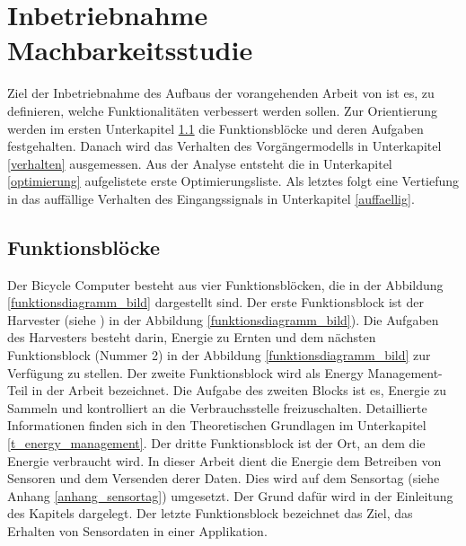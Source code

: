  
\section{Inbetriebnahme Machbarkeitsstudie}\label{v_inbetriebnahme} 

      
Ziel der Inbetriebnahme des Aufbaus der vorangehenden Arbeit von \cite{PA_bicycle} ist es, zu definieren, welche Funktionalitäten verbessert werden sollen. Zur Orientierung werden im ersten Unterkapitel \ref{fb} die Funktionsblöcke und deren Aufgaben festgehalten. Danach wird das Verhalten des Vorgängermodells in Unterkapitel \ref{verhalten} ausgemessen. Aus der Analyse entsteht die in Unterkapitel \ref{optimierung} aufgelistete erste Optimierungsliste. Als letztes folgt eine Vertiefung in das auffällige Verhalten des Eingangssignals in Unterkapitel \ref{auffaellig}.
      
\subsection{Funktionsblöcke}\label{fb} 

Der Bicycle Computer besteht aus vier Funktionsblöcken, die in der Abbildung \ref{funktionsdiagramm_bild} dargestellt sind. Der erste Funktionsblock ist der Harvester (siehe ) \glqq in der Abbildung \ref{funktionsdiagramm_bild}). Die Aufgaben des Harvesters besteht darin, Energie zu Ernten und dem nächsten Funktionsblock (Nummer 2) in der Abbildung  \ref{funktionsdiagramm_bild} zur Verfügung zu stellen. Der zweite Funktionsblock wird als Energy Management-Teil in der Arbeit bezeichnet. Die Aufgabe des zweiten Blocks ist es, Energie zu Sammeln und kontrolliert an die Verbrauchsstelle freizuschalten. Detaillierte Informationen finden sich in den Theoretischen Grundlagen im Unterkapitel \ref{t_energy_management}. Der dritte Funktionsblock ist der Ort, an dem die Energie verbraucht wird. In dieser Arbeit dient die Energie dem Betreiben von Sensoren und dem Versenden derer Daten. Dies wird auf dem Sensortag (siehe Anhang \ref{anhang_sensortag}) umgesetzt. Der Grund dafür wird in der Einleitung des Kapitels \label{t_power_management} dargelegt. Der letzte Funktionsblock bezeichnet das Ziel, das Erhalten von Sensordaten in einer Applikation.  


